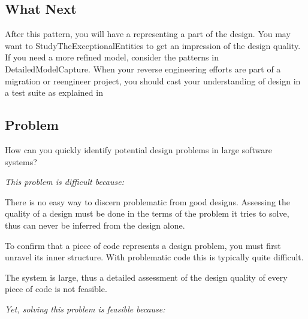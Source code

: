 \documentclass[a4paper,10pt,twoside]{book}
\begin{document}
\subsection*{What Next}

After this pattern, you will have a  representing a part of the 
design. You may want to 
{StudyTheExceptionalEntities} to get an impression of the design quality. If you need a 
more refined model, consider the patterns in 
{DetailedModelCapture}. When your reverse engineering efforts are part of a migration or 
reengineer project, you should cast your understanding of design in a test suite as 
explained in 



\subsection*{Problem}

How can you quickly identify potential design problems in large software systems?

\emph{This problem is difficult because:}

\begin{bulletlist}
\item There is no easy way to discern problematic from good designs. Assessing the quality 
of a design must be done in the terms of the problem it tries to solve, thus can never be 
inferred from the design alone.

\item To confirm that a piece of code represents a design problem, you must first unravel 
its inner structure. With problematic code this is typically quite difficult.

\item The system is large, thus a detailed assessment of the design quality of every piece 
of code is not feasible.
\end{bulletlist}

\emph{Yet, solving this problem is feasible because:}
\end{document}
